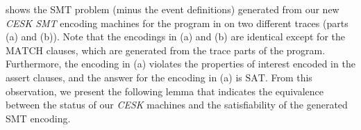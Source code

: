  shows the SMT problem (minus the event definitions) generated from our new \textit{CESK SMT} encoding machines for the program in  on two different traces (parts (a) and (b)). Note that the encodings in  (a) and (b) are identical except for the $\mathrm{MATCH}$ clauses, which are generated from the trace parts of the program. Furthermore, the encoding in (a) violates the properties of interest encoded in the assert clauses, and the answer for the encoding in  (a) is $\mathrm{SAT}$. From this observation, we present the following lemma that indicates the equivalence between the status of our \textit{CESK} machines and the satisfiability of the generated SMT encoding.%



